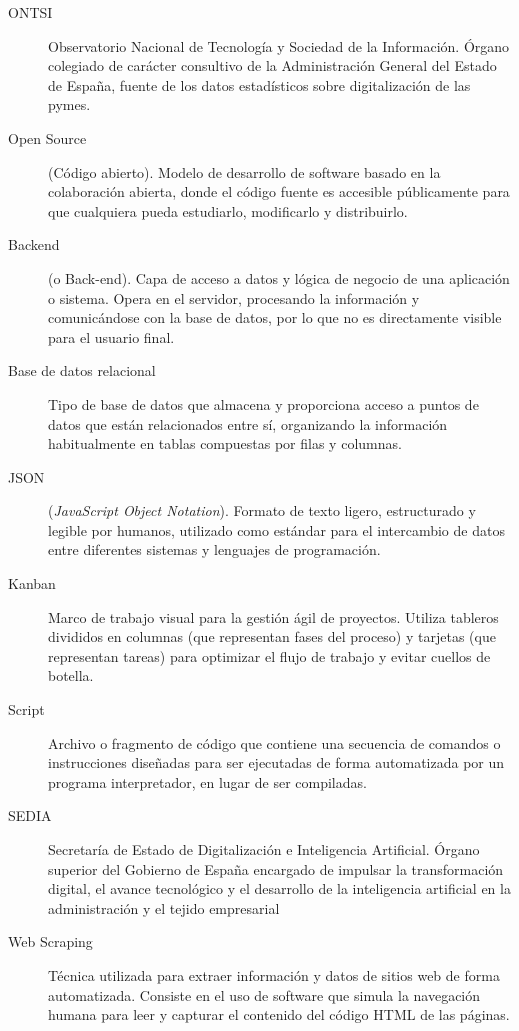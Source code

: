 \begin{description}
    \item[ONTSI] Observatorio Nacional de Tecnología y Sociedad de la Información. Órgano colegiado de carácter consultivo de la Administración General del Estado de España, fuente de los datos estadísticos sobre digitalización de las pymes.
    \item[Open Source] (Código abierto). Modelo de desarrollo de software basado en la colaboración abierta, donde el código fuente es accesible públicamente para que cualquiera pueda estudiarlo, modificarlo y distribuirlo.
    \item[Backend] (o Back-end). Capa de acceso a datos y lógica de negocio de una aplicación o sistema. Opera en el servidor, procesando la información y comunicándose con la base de datos, por lo que no es directamente visible para el usuario final.
    \item[Base de datos relacional] Tipo de base de datos que almacena y proporciona acceso a puntos de datos que están relacionados entre sí, organizando la información habitualmente en tablas compuestas por filas y columnas.
    \item[JSON] (\textit{JavaScript Object Notation}). Formato de texto ligero, estructurado y legible por humanos, utilizado como estándar para el intercambio de datos entre diferentes sistemas y lenguajes de programación.
    \item[Kanban] Marco de trabajo visual para la gestión ágil de proyectos. Utiliza tableros divididos en columnas (que representan fases del proceso) y tarjetas (que representan tareas) para optimizar el flujo de trabajo y evitar cuellos de botella.
    \item[Script] Archivo o fragmento de código que contiene una secuencia de comandos o instrucciones diseñadas para ser ejecutadas de forma automatizada por un programa interpretador, en lugar de ser compiladas.
    \item[SEDIA] Secretaría de Estado de Digitalización e Inteligencia Artificial. Órgano superior del Gobierno de España encargado de impulsar la transformación digital, el avance tecnológico y el desarrollo de la inteligencia artificial en la administración y el tejido empresarial
    \item[Web Scraping] Técnica utilizada para extraer información y datos de sitios web de forma automatizada. Consiste en el uso de software que simula la navegación humana para leer y capturar el contenido del código HTML de las páginas.
\end{description}
